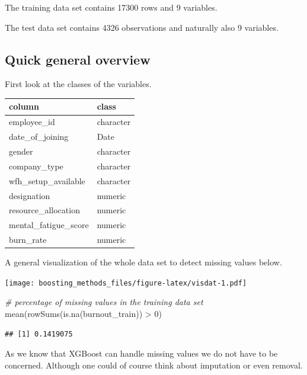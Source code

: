 \documentclass[
]{book}
\newenvironment{Shaded}{\begin{snugshade}}{\end{snugshade}}
\newcommand{\CommentTok}[1]{\textcolor[rgb]{0.56,0.35,0.01}{\textit{#1}}}
\newcommand{\DecValTok}[1]{\textcolor[rgb]{0.00,0.00,0.81}{#1}}
\newcommand{\FunctionTok}[1]{\textcolor[rgb]{0.00,0.00,0.00}{#1}}
\newcommand{\NormalTok}[1]{#1}
\newcommand{\SpecialCharTok}[1]{\textcolor[rgb]{0.00,0.00,0.00}{#1}}
\begin{document}
The training data set contains 17300 rows and 9 variables.

The test data set contains 4326 observations and naturally also 9 variables.

\hypertarget{quick-general-overview}{%
\subsection{Quick general overview}\label{quick-general-overview}}

First look at the classes of the variables.

\begin{tabular}{l|l}
\hline
column & class\\
\hline
employee\_id & character\\
\hline
date\_of\_joining & Date\\
\hline
gender & character\\
\hline
company\_type & character\\
\hline
wfh\_setup\_available & character\\
\hline
designation & numeric\\
\hline
resource\_allocation & numeric\\
\hline
mental\_fatigue\_score & numeric\\
\hline
burn\_rate & numeric\\
\hline
\end{tabular}

A general visualization of the whole data set to detect missing values below.

\texttt{[image: boosting\_methods\_files/figure-latex/visdat-1.pdf]}

\begin{Shaded}
\begin{Highlighting}[]
\CommentTok{\# percentage of missing values in the training data set}
\FunctionTok{mean}\NormalTok{(}\FunctionTok{rowSums}\NormalTok{(}\FunctionTok{is.na}\NormalTok{(burnout\_train)) }\SpecialCharTok{\textgreater{}} \DecValTok{0}\NormalTok{)}
\end{Highlighting}
\end{Shaded}

\begin{verbatim}
## [1] 0.1419075
\end{verbatim}

As we know that XGBoost can handle missing values we do not have to be concerned. Although one could of course think about imputation or even removal.
\end{document}
